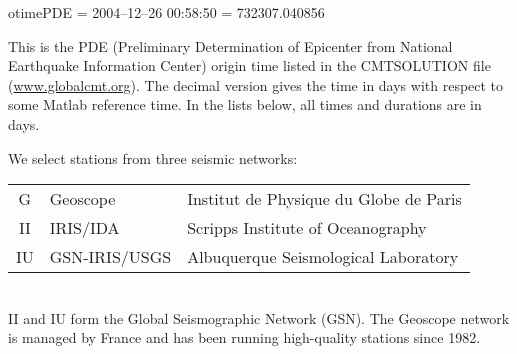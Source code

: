 \documentclass[11pt,titlepage,fleqn]{article}
\begin{document}
\vspace{0.5cm}
otimePDE = 2004--12--26 00:58:50 = 732307.040856
\vspace{0.5cm}

\noindent
This is the PDE (Preliminary Determination of Epicenter from National Earthquake Information Center) origin time listed in the CMTSOLUTION file (\url{www.globalcmt.org}). The decimal version gives the time in days with respect to some Matlab reference time. In the lists below, all times and durations are in days.

\medskip\noindent
We select stations from three seismic networks: \\

\begin{tabular}{cll}
\hline
G   & Geoscope      & Institut de Physique du Globe de Paris \\
II  & IRIS/IDA      & Scripps Institute of Oceanography \\
IU  & GSN-IRIS/USGS & Albuquerque Seismological Laboratory \\
\hline
\end{tabular} \\

\noindent
II and IU form the Global Seismographic Network (GSN).
The Geoscope network is managed by France and has been running high-quality stations since 1982.
\end{document}

